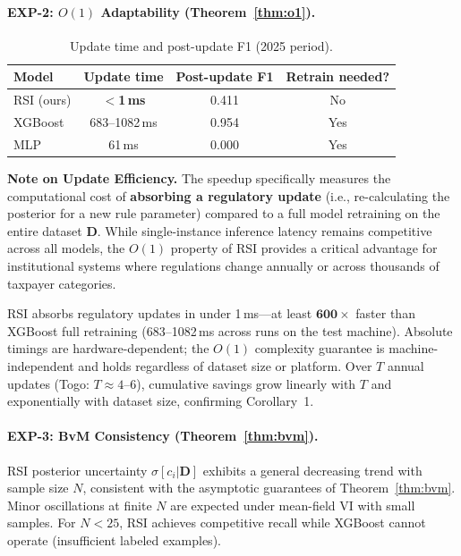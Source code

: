 \documentclass[letterpaper]{article}
\begin{document}
\paragraph{EXP-2: $O(1)$ Adaptability (Theorem~\ref{thm:o1}).}

\begin{table}[H]
\centering
\caption{Update time and post-update F1 (2025 period).}
\label{tab:update}
\renewcommand{\arraystretch}{1.2}
\begin{tabular}{lccc}
\toprule
\textbf{Model} & \textbf{Update time} & \textbf{Post-update F1}
  & \textbf{Retrain needed?} \\
\midrule
RSI (ours) & \textbf{$<$1\,ms} & 0.411 & No \\
XGBoost & 683--1082\,ms & 0.954 & Yes \\
MLP & 61\,ms & 0.000 & Yes \\
\bottomrule
\end{tabular}
\end{table}

\noindent\textbf{Note on Update Efficiency.} The speedup specifically measures the computational cost of \textbf{absorbing a regulatory update} (i.e., re-calculating the posterior for a new rule parameter) compared to a full model retraining on the entire dataset $\mathbf{D}$. While single-instance inference latency remains competitive across all models, the $O(1)$ property of RSI provides a critical advantage for institutional systems where regulations change annually or across thousands of taxpayer categories.

RSI absorbs regulatory updates in under 1\,ms---at least $\mathbf{600\times}$ faster than
XGBoost full retraining (683--1082\,ms across runs on the test machine).
Absolute timings are hardware-dependent; the $O(1)$ complexity guarantee
is machine-independent and holds regardless of dataset size or platform.
Over $T$ annual updates (Togo: $T \approx 4$--$6$),
cumulative savings grow linearly with $T$ and exponentially with
dataset size, confirming Corollary~1.

\paragraph{EXP-3: BvM Consistency (Theorem~\ref{thm:bvm}).}
RSI posterior uncertainty $\sigma[c_i | \mathbf{D}]$ exhibits a
general decreasing trend with sample size $N$, consistent with the
asymptotic guarantees of Theorem~\ref{thm:bvm}. Minor oscillations
at finite $N$ are expected under mean-field VI with small samples.
For $N < 25$, RSI achieves competitive recall while XGBoost cannot
operate (insufficient labeled examples).
\end{document}
